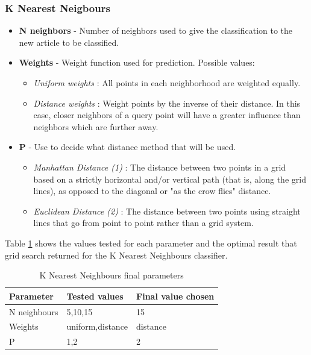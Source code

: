 \documentclass[a4paper,11pt]{report}
\begin{document}
\subsubsection{K Nearest Neigbours}
\begin{itemize}
	\item \textbf{N neighbors} - Number of neighbors used to give the classification to the new article to be classified.
	\item \textbf{Weights} - Weight function used for prediction. Possible values:
	\begin{itemize}
		 \item \textit{Uniform weights} : All points in each neighborhood are weighted equally.
		 \item \textit{Distance weights} : Weight points by the inverse of their distance. In this case, closer neighbors of a query point will have a greater influence than neighbors which are further away.
	\end{itemize}
	\item \textbf{P} - Use to decide what distance method that will be used.
	\begin{itemize}
		\item \textit{Manhattan Distance (1)} : The distance between two points in a grid based on a strictly horizontal and/or vertical path (that is, along the grid lines), as opposed to the diagonal or "as the crow flies" distance.
		\item \textit{Euclidean Distance (2)} : The distance between two points using straight lines that go from point to point rather than a grid system.
	\end{itemize}
\end{itemize}

Table \ref{nearest-finalp} shows the values tested for each parameter and the optimal result that grid search returned for the K Nearest Neighbours classifier.

\begin{table}[h!]
\centering
\caption{K Nearest Neighbours final parameters}
\label{nearest-finalp}
\begin{tabular}{|l|l|l|}
\hline
Parameter    & Tested values    & Final value chosen \\ \hline
N neighbours & 5,10,15          & 15                 \\ \hline
Weights      & uniform,distance & distance           \\ \hline
P            & 1,2              & 2                  \\ \hline
\end{tabular}
\end{table}
\end{document}
